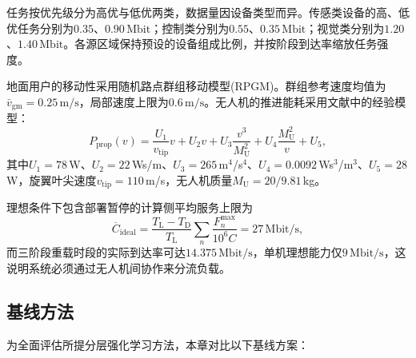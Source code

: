 任务按优先级分为高优与低优两类，数据量因设备类型而异。传感类设备的高、低优任务分别为$0.35$、$0.90\,\mathrm{Mbit}$；控制类分别为$0.55$、$0.35\,\mathrm{Mbit}$；视觉类分别为$1.20$、$1.40\,\mathrm{Mbit}$。各源区域保持预设的设备组成比例，并按阶段到达率缩放任务强度。

地面用户的移动性采用随机路点群组移动模型(RPGM)。群组参考速度均值为$\bar v_{\mathrm{gm}}=0.25\,\mathrm{m/s}$，局部速度上限为$0.6\,\mathrm{m/s}$。无人机的推进能耗采用文献中的经验模型：
\begin{equation}
P_{\mathrm{prop}}(v)=\frac{U_1}{v_{\mathrm{tip}}}v+U_2 v+U_3\frac{v^3}{M_{\mathrm U}^2}+U_4\frac{M_{\mathrm U}^2}{v}+U_5,
\end{equation}
其中$U_1=78\,$W、$U_2=22\,$Ws/m、$U_3=265\,$m$^4$/s$^4$、$U_4=0.0092\,$Ws$^3$/m$^3$、$U_5=28\,$W，旋翼叶尖速度$v_{\mathrm{tip}}=110\,$m/s，无人机质量$M_{\mathrm U}=20/9.81\,$kg。

理想条件下包含部署暂停的计算侧平均服务上限为
\begin{equation}
\overline C_{\mathrm{ideal}}
=\frac{T_{\mathrm L}-T_{\mathrm D}}{T_{\mathrm L}}
\sum_n\frac{F_n^{\max}}{10^6 C}
=27\,\mathrm{Mbit/s},
\label{eq:capacity_ideal}
\end{equation}
而三阶段重载时段的实际到达率可达$14.375\,\mathrm{Mbit/s}$，单机理想能力仅$9\,\mathrm{Mbit/s}$，这说明系统必须通过无人机间协作来分流负载。

\subsection{基线方法}
\label{ssec:baselines}

为全面评估所提分层强化学习方法，本章对比以下基线方案：

